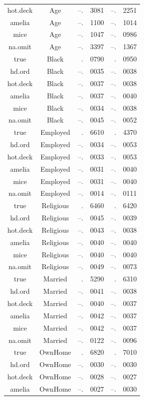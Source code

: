 \documentclass[12pt,econ]{sources/authesis}
\begin{document}
\begin{longtable}{ccr@{}lr@{}l}
 hot.deck & Age & --.&3081 & --.&2251 \\
 amelia & Age & --.&1100 & --.&1014 \\ 
 mice & Age & --.&1047 & --.&0986 \\ 
 na.omit & Age & --.&3397 & --.&1367 \\
 true & Black & .&0790 & .&0950 \\
 hd.ord & Black & --.&0035 & --.&0038 \\
 hot.deck & Black & --.&0037 & --.&0038 \\ 
 amelia & Black & --.&0037 & --.&0040 \\ 
 mice & Black & --.&0034 & --.&0038 \\
 na.omit & Black & --.&0045 & --.&0052 \\
 true & Employed & .&6610 & .&4370 \\
 hd.ord & Employed & --.&0034 & --.&0053 \\
 hot.deck & Employed & --.&0033 & --.&0053 \\
 amelia & Employed & --.&0031 & --.&0040 \\
 mice & Employed & --.&0031 & --.&0040 \\ 
 na.omit & Employed & --.&0014 & --.&0111 \\ 
 true & Religious & .&6460 & .&6420 \\ 
 hd.ord & Religious & --.&0045 & --.&0039 \\
 hot.deck & Religious & --.&0043 & --.&0038 \\
 amelia & Religious & --.&0040 & --.&0040 \\
 mice & Religious & --.&0040 & --.&0040 \\ 
 na.omit & Religious & --.&0049 & --.&0073 \\ 
 true & Married & .&5290 & .&6310 \\ 
 hd.ord & Married & --.&0041 & --.&0038 \\
 hot.deck & Married & --.&0040 & --.&0037 \\ 
 amelia & Married & --.&0042 & --.&0037 \\ 
 mice & Married & --.&0042 & --.&0037 \\ 
 na.omit & Married & --.&0122 & --.&0096 \\ 
 true & OwnHome & .&6820 & .&7010 \\ 
 hd.ord & OwnHome & --.&0030 & --.&0030 \\ 
 hot.deck & OwnHome & --.&0028 & --.&0027 \\
 amelia & OwnHome & --.&0027 & --.&0030 \\ 

\end{longtable}
\end{document}
